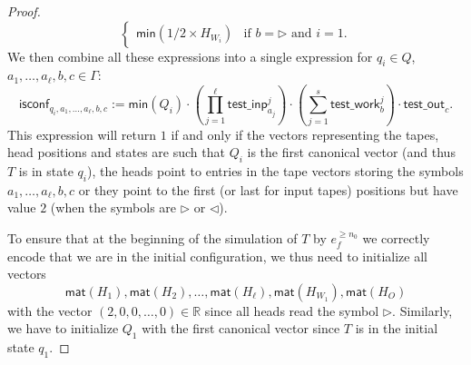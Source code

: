 \begin{proof}
$$\begin{cases}
    \mathsf{min}(1/2\times H_{W_i}) & \text{if $b=\rhd$ and $i=1$}.
    \end{cases}
    $$
    We then combine all these expressions into a single expression for $q_i\in Q$, 
    $a_1,\ldots,a_\ell,b,c\in\Gamma$:
    $$
    \mathsf{isconf}_{q_i,a_1,\ldots,a_\ell,b,c}:=
    \mathsf{min}(Q_i)\cdot \left(\prod_{j=1}^{\ell} \mathsf{test\_inp}_{a_j}^j\right)
    \cdot\left(\sum_{j=1}^s \mathsf{test\_work}_b^j\right)\cdot \mathsf{test\_out}_{c}.
    $$
    This expression will return $1$ if and only if the vectors representing the tapes, 
    head positions and states are such that $Q_i$ is the first canonical vector 
    (and thus $T$ is in state $q_i$), the heads point to entries in the tape vectors storing 
    the symbols $a_1,\ldots,a_{\ell}, b,c$ or they point to the first (or last for input tapes) 
    positions but have value $2$ (when the symbols are $\rhd$ or $\lhd$). 

    To ensure that at the beginning of the simulation of $T$ by $e_f^{\geq n_0}$ we correctly encode 
    that we are in the initial configuration, we thus need to initialize all vectors 
    $$\mathsf{mat}(H_1),\mathsf{mat}(H_2),\ldots, \mathsf{mat}(H_\ell), \mathsf{mat}(H_{W_1}),\mathsf{mat}(H_O)$$
    with the vector $(2,0,0,\ldots,0)\in\mathbb{R}$ since all heads read the symbol $\rhd$. Similarly, 
    we have to initialize $Q_1$ with the first canonical vector since $T$ is in the initial state $q_1$.


\end{proof}
